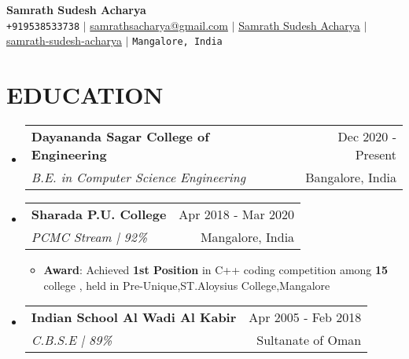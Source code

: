 \documentclass[letterpaper,11pt]{article}
\makeatletter
\newcommand{\resumeItem}[1]{
  \item\small{
    {#1 \vspace{-1pt}}
  }
}
\newcommand{\resumeSubheading}[4]{
  \vspace{-1pt}\item
    \begin{tabular*}{\textwidth}[t]{l@{\extracolsep{\fill}}r}
      \textbf{#1} & {\color{dark-grey}\small #2}\vspace{1pt}\\ %
      \textit{#3} & {\color{dark-grey} \small #4}\\ %
    \end{tabular*}\vspace{-4pt}
}
\newcommand{\resumeSubHeadingListStart}{\begin{itemize}[leftmargin=0in, label={}]}
\newcommand{\resumeSubHeadingListEnd}{\end{itemize}}
\newcommand{\resumeItemListStart}{\begin{itemize}}
\newcommand{\resumeItemListEnd}{\end{itemize}\vspace{0pt}}
\makeatother
\begin{document}
\begin{center}
    \textbf{\Huge Samrath Sudesh Acharya} \\ \vspace{5pt}
    \small \faPhone \texttt{+919538533738} \hspace{1pt} $|$
    \hspace{1pt} \faEnvelope \hspace{2pt} \href{mailto:samrathsacharya@gmail.com}{samrathsacharya@gmail.com} \hspace{1pt} $|$ 
    \hspace{1pt} \faLinkedinSquare \hspace{2pt} \href{https://www.linkedin.com/in/samrath-sudesh-acharya/}{Samrath Sudesh Acharya} \hspace{1pt} $|$
    \hspace{1pt} \faGithub \hspace{2pt} \href{https://github.com/samrath-sudesh-acharya}{samrath-sudesh-acharya}
    \hspace{1pt} $|$
    \hspace{1pt} \faMapMarker* \hspace{2pt}\texttt{Mangalore, India} 
    \\ \vspace{-3pt}
\end{center}

\section {EDUCATION}
  \resumeSubHeadingListStart
    \resumeSubheading
      {Dayananda Sagar College of Engineering}{Dec 2020 - Present}
      {B.E. in Computer Science Engineering}{Bangalore, India}
        
    \resumeSubheading
      {Sharada P.U. College}{Apr 2018 - Mar 2020}
      {PCMC Stream | 92\%}{Mangalore, India}
      	\resumeItemListStart
    	\resumeItem {\textbf{Award}: Achieved \textbf{1st Position} in C++ coding competition among \textbf{15} college , held in \newline Pre-Unique,ST.Aloysius College,Mangalore}
        \resumeItemListEnd
    
    \resumeSubheading
      {Indian School Al Wadi Al Kabir}{Apr 2005 - Feb 2018}
      {C.B.S.E | 89\%}{Sultanate of Oman}
  \resumeSubHeadingListEnd

\end{document}

